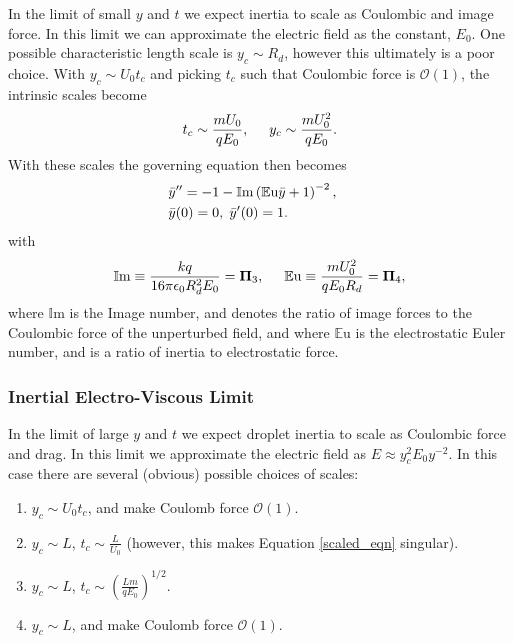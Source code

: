 \documentclass[a4paper, 12pt]{article}
\begin{document}
In the limit of small $y$ and $t$ we expect inertia to scale as Coulombic and image force. In this limit we can approximate the electric field as the constant, $E_0$. One possible characteristic length scale is $y_c \sim R_d$, however this ultimately is a poor choice. With $y_c \sim U_0 t_c$ and picking $t_c$ such that Coulombic force is $\mathcal{O}(1)$, the intrinsic scales become
\[ t_c \sim \frac{m U_0}{q E_0}, \hspace{5 mm}
y_c \sim \frac{m U_0^2}{q E_0} .
\]
With these scales the governing equation then becomes
\begin{eqnarray}
& \bar{y}'' = -1 - \mathbb{I}\mbox{m} \left( \mathbb{E}\mbox{u}\bar{y} + 1 \right)^{-2} ,& \nonumber \\
& \bar{y}(0) = 0, \hspace{1 mm} \bar{y}'(0) = 1 .& \label{img_limit}
\end{eqnarray} 
with 
\[ \mathbb{I}\mbox{m} \equiv \frac{k q}{16 \pi \epsilon_0 R_d^2 E_0} = \mathbf{\Pi}_3, \hspace{5 mm}
\mathbb{E}\mbox{u} \equiv \frac{m U_0^2}{q E_0 R_d} = \mathbf{\Pi}_4 ,
\]
where $\mathbb{I}\mbox{m}$ is the Image number, and denotes the ratio of image forces to the Coulombic force of the unperturbed field, and where $\mathbb{E}\mbox{u}$ is the electrostatic Euler number, and is a ratio of inertia to electrostatic force.

\subsubsection{Inertial Electro-Viscous Limit}

In the limit of large $y$ and $t$ we expect droplet inertia to scale as Coulombic force and drag. In this limit we approximate the electric field as $E \approx y_c^2 E_0 y^{-2}$. In this case there are several (obvious) possible choices of scales:
\begin{enumerate}
\item $y_c \sim U_0 t_c$, and make Coulomb force $\mathcal{O}(1)$.
\item $y_c \sim L$, $t_c \sim \frac{L}{U_0}$ (however, this makes Equation \ref{scaled_eqn} singular).
\item $y_c \sim L$, $t_c \sim \left( \frac{L m}{q E_0} \right)^{1/2}$.
\item $y_c \sim L$, and make Coulomb force $\mathcal{O}(1)$.
\end{enumerate}
\end{document}
